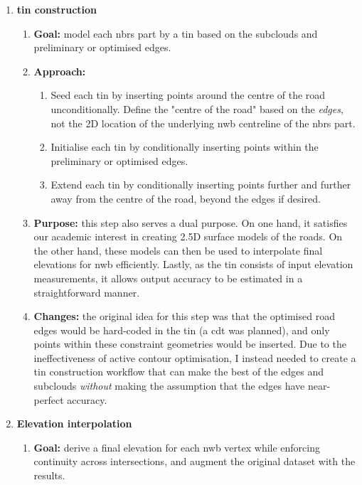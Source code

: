 \begin{enumerate}
\begin{enumerate}
    \end{enumerate}
    \item \textbf{\ac{tin} construction}
    \begin{enumerate}
        \item \textbf{Goal:} model each \ac{nbrs} part by a \ac{tin} based on the subclouds and preliminary or optimised edges.
        \item \textbf{Approach:}
        \begin{enumerate}
            \item Seed each \ac{tin} by inserting points around the centre of the road unconditionally. Define the "centre of the road" based on the \textit{edges}, not the 2D location of the underlying \ac{nwb} centreline of the \ac{nbrs} part.
            \item Initialise each \ac{tin} by conditionally inserting points within the preliminary or optimised edges.
            \item Extend each \ac{tin} by conditionally inserting points further and further away from the centre of the road, beyond the edges if desired. 
        \end{enumerate}
        \item \textbf{Purpose:} this step also serves a dual purpose. On one hand, it satisfies our academic interest in creating 2.5D surface models of the roads. On the other hand, these models can then be used to interpolate final elevations for \ac{nwb} efficiently. Lastly, as the \ac{tin} consists of input elevation measurements, it allows output accuracy to be estimated in a straightforward manner.
        \item \textbf{Changes:} the original idea for this step was that the optimised road edges would be hard-coded in the \ac{tin} (a \ac{cdt} was planned), and only points within these constraint geometries would be inserted. Due to the ineffectiveness of active contour optimisation, I instead needed to create a \ac{tin} construction workflow that can make the best of the edges and subclouds \textit{without} making the assumption that the edges have near-perfect accuracy.
    \end{enumerate}
    \item \textbf{Elevation interpolation}
    \begin{enumerate}
        \item \textbf{Goal:} derive a final elevation for each \ac{nwb} vertex while enforcing continuity across intersections, and augment the original dataset with the results.

\end{enumerate}
\end{enumerate}
